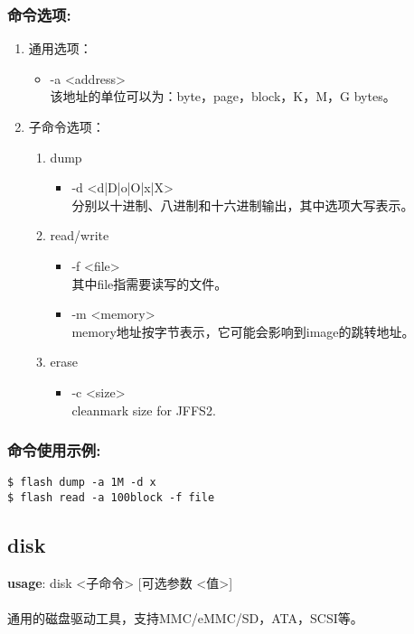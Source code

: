 \subsubsection{命令选项:}
\begin{enumerate}
	\item 通用选项：
	\begin{itemize}
		\item -a <address> \\
		该地址的单位可以为：byte，page，block，K，M，G bytes。
	\end{itemize}

	\item 子命令选项：
	\begin{enumerate}
		\item dump
		\begin{itemize}
			\item -d <d|D|o|O|x|X> \\
			分别以十进制、八进制和十六进制输出，其中选项大写表示。 %
		\end{itemize}

		\item read/write
		\begin{itemize}
			\item -f <file> \\
			其中file指需要读写的文件。
			\item -m <memory> \\
			memory地址按字节表示，它可能会影响到image的跳转地址。
		\end{itemize}

		\item erase
		\begin{itemize}
			\item -c <size> \\
			cleanmark size for JFFS2. %
		\end{itemize}
	\end{enumerate}
\end{enumerate}

\subsubsection{命令使用示例:}
\begin{lstlisting}[numbers=none]
$ flash dump -a 1M -d x
$ flash read -a 100block -f file
\end{lstlisting}

\subsection{disk}
\textbf{usage}: disk <子命令> [可选参数 <值>] \\
\\ 通用的磁盘驱动工具，支持MMC/eMMC/SD，ATA，SCSI等。

